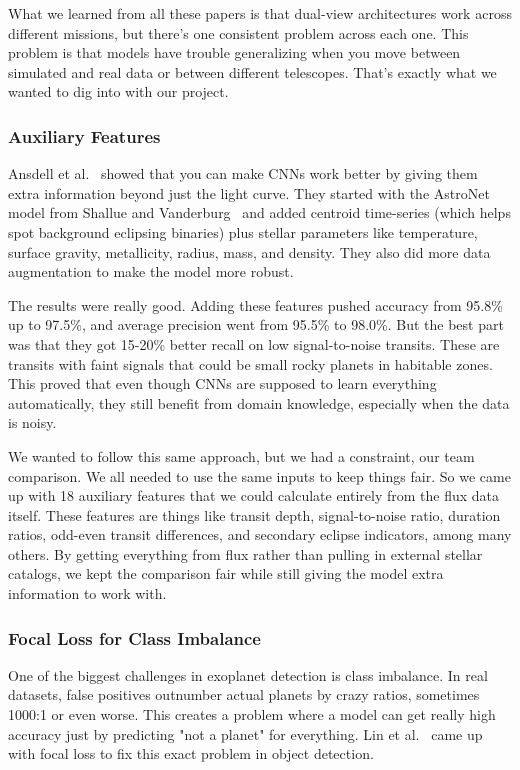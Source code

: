\documentclass[letterpaper]{article} %
\begin{document}
What we learned from all these papers is that dual-view architectures work across different missions, but there's one consistent problem across each one. This problem is that models have trouble generalizing when you move between simulated and real data or between different telescopes. That's exactly what we wanted to dig into with our project.
\subsubsection{Auxiliary Features}

Ansdell et al.~\cite{ansdell2018scientific} showed that you can make CNNs work better by giving them extra information beyond just the light curve. They started with the AstroNet model from Shallue and Vanderburg~\cite{Shallue2018identifyexoplanetsI} and added centroid time-series (which helps spot background eclipsing binaries) plus stellar parameters like temperature, surface gravity, metallicity, radius, mass, and density. They also did more data augmentation to make the model more robust.

The results were really good. Adding these features pushed accuracy from 95.8\% up to 97.5\%, and average precision went from 95.5\% to 98.0\%. But the best part was that they got 15-20\% better recall on low signal-to-noise transits. These are transits with faint signals that could be small rocky planets in habitable zones. This proved that even though CNNs are supposed to learn everything automatically, they still benefit from domain knowledge, especially when the data is noisy.

We wanted to follow this same approach, but we had a constraint, our team comparison. We all needed to use the same inputs to keep things fair. So we came up with 18 auxiliary features that we could calculate entirely from the flux data itself. These features are things like transit depth, signal-to-noise ratio, duration ratios, odd-even transit differences, and secondary eclipse indicators, among many others. By getting everything from flux rather than pulling in external stellar catalogs, we kept the comparison fair while still giving the model extra information to work with.

\subsubsection{Focal Loss for Class Imbalance}

One of the biggest challenges in exoplanet detection is class imbalance. In real datasets, false positives outnumber actual planets by crazy ratios, sometimes 1000:1 or even worse. This creates a problem where a model can get really high accuracy just by predicting "not a planet" for everything. Lin et al.~\cite{lin2017focal} came up with focal loss to fix this exact problem in object detection.
\end{document}
